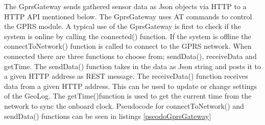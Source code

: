 The GprsGateway sends gathered sensor data as Json objects via HTTP to a HTTP API
mentioned below. The GprsGateway uses AT commands\cite{ATcommands} to control the GPRS module. A typical use of the GprsGateway is first to check if the system is online by calling the connected() function. If the system is offline the 
connectToNetwork() function is called to connect to the GPRS network. When connected 
there are three functions to choose from; sendData(), receiveData and getTime. The 
sendData() function takes in the data as Json string and posts it to a given HTTP address
as REST\cite{rest} message. The receiveData() function receives data from a given HTTP
address. This can be used to update or change settings of the GeoLog. The getTime()function is used to get the current time from the network to sync the onboard clock.
Pseudocode for connectToNetwork() and sendData() functions can be seen in listings 
\ref{pseodoGprsGateway}

